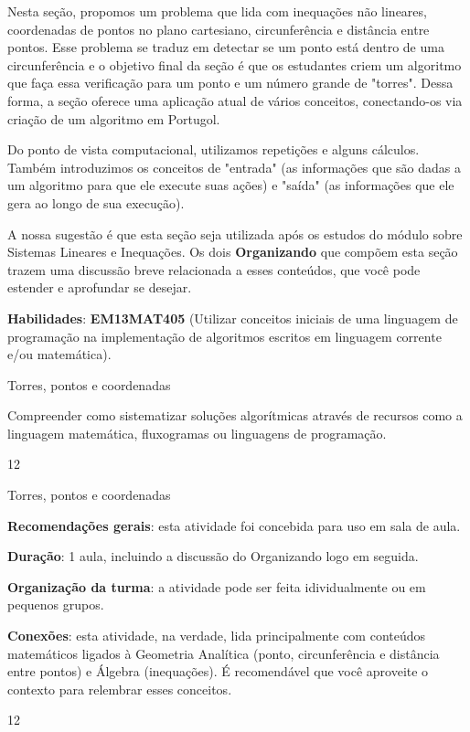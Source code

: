 \label{comp-exp10}
\begin{texto}
{
Nesta seção, propomos um problema que lida com inequações não lineares, coordenadas de pontos no plano cartesiano, circunferência e distância entre pontos. Esse problema se traduz em detectar se um ponto está dentro de uma circunferência e o objetivo final da seção é que os estudantes criem um algoritmo que faça essa verificação para um ponto e um número grande de "torres". Dessa forma, a seção oferece uma aplicação atual de vários conceitos, conectando-os via criação de um algoritmo em Portugol.

Do ponto de vista computacional, utilizamos repetições e alguns cálculos. Também introduzimos os conceitos de "entrada"{} (as informações que são dadas a um algoritmo para que ele execute suas ações) e "saída"{} (as informações que ele gera ao longo de sua execução).

A nossa sugestão é que esta seção seja utilizada após os estudos do módulo sobre Sistemas Lineares e Inequações. Os dois \textbf{Organizando} que compõem esta seção trazem uma discussão breve relacionada a esses conteúdos, que você pode estender e aprofundar se desejar.

\textbf{Habilidades}: \textbf{EM13MAT405} (Utilizar conceitos iniciais de uma linguagem de programação na implementação de algoritmos escritos em linguagem corrente e/ou matemática).
}
\end{texto}
\clearmargin
\begin{objectives}{Torres, pontos e coordenadas}
{
Compreender como sistematizar soluções algorítmicas através de recursos como a linguagem matemática, fluxogramas ou linguagens de programação.


}{1}{2}
\end{objectives}
\begin{sugestions}{Torres, pontos e coordenadas}
{
\textbf{Recomendações gerais}: esta atividade foi concebida para uso em sala de aula.

\textbf{Duração}: 1 aula, incluindo a discussão do Organizando logo em seguida.

\textbf{Organização da turma}: a atividade pode ser feita idividualmente ou em pequenos grupos.

\textbf{Conexões}: esta atividade, na verdade, lida principalmente com conteúdos matemáticos ligados à Geometria Analítica (ponto, circunferência e distância entre pontos) e Álgebra (inequações). É recomendável que você aproveite o contexto para relembrar esses conceitos.


}{1}{2}
\end{sugestions}
